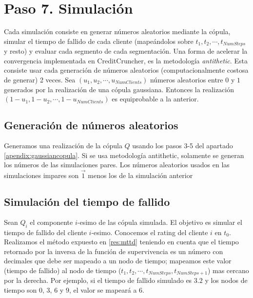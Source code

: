 
\section{Paso 7. Simulaci\'on}

Cada simulaci\'on consiste en generar n\'umeros aleatorios
mediante la c\'opula, simular el tiempo de fallido de cada
cliente (mape\'andolos sobre $t_1, t_2, \cdots, t_{NumSteps}$ y
resto) y evaluar cada segmento de cada segmentaci\'on.
\newline
\newline
Una forma de acelerar la convergencia implementada en CreditCruncher,
es la metodolog\'ia \emph{antithetic}. Esta consiste
usar cada generaci\'on de n\'umeros aleatorios (computacionalmente
costosa de generar) 2 veces. Sea $(u_1, u_2, \cdots, u_{NumClients})$
n\'umeros aleatorios entre $0$ y $1$ generados por la realizaci\'on
de una c\'opula gaussiana. Entonces la realizaci\'on
$\left(1-u_1, 1-u_2, \cdots, 1-u_{NumClients}\right)$ es equiprobable 
a la anterior.

\subsection{Generaci\'on de n\'umeros aleatorios}

Generamos una realizaci\'on de la c\'opula $Q$ usando los pasos 3-5
del apartado \ref{apendix:gaussiancopula}.
\newline
\newline
Si se usa metodolog\'ia antithetic, solamente se generan los n\'umeros
de las simulaciones pares. Los n\'umeros aleatorios usados en las simulaciones
impares son $\vec{1}$ menos los de la simulaci\'on anterior 

\subsection{Simulaci\'on del tiempo de fallido}

Sean $Q_i$ el componente $i$-esimo de las c\'opula simulada. El objetivo es
simular el tiempo de fallido del cliente $i$-esimo. Conocemos el rating del
cliente $i$ en $t_0$. Realizamos el m\'etodo expuesto en \ref{res:mttd} teniendo
en cuenta que el tiempo retornado por la inversa de la funci\'on de supervivencia
es un n\'umero con decimales que debe ser mapeado a un nodo de tiempo; mapeamos 
este valor (tiempo de fallido) al nodo de tiempo 
($t_1, t_2, \cdots, t_{NumSteps}, t_{NumSteps+1}$) mas cercano por la derecha. 
Por ejemplo, si el tiempo de fallido simulado es $3.2$ y los nodos de tiempo son 
$0$, $3$, $6$ y $9$, el valor se mapear\'a a $6$.

